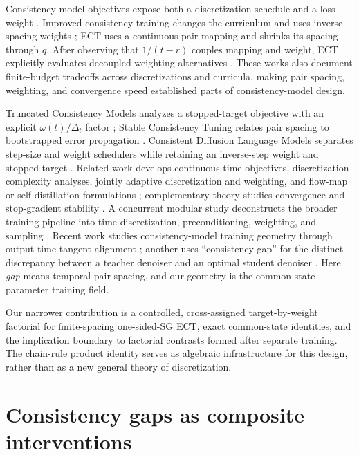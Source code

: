 \documentclass{article}
\begin{document}
Consistency-model objectives expose both a discretization schedule and a loss
weight \citep{song2023consistency}. Improved consistency training changes the
curriculum and uses inverse-spacing weights \citep{song2024improved}; ECT uses
a continuous pair mapping and shrinks its spacing through $q$. After observing
that $1/(t-r)$ couples mapping and weight, ECT explicitly evaluates decoupled
weighting alternatives \citep{geng2024consistency}.
These works also document finite-budget tradeoffs across discretizations and
curricula, making pair spacing, weighting, and convergence speed established
parts of consistency-model design.

Truncated Consistency Models analyzes a stopped-target objective with an
explicit $\omega(t)/\Delta_t$ factor \citep{lee2025truncated}; Stable
Consistency Tuning relates pair spacing to bootstrapped error propagation
\citep{wang2024stable}. Consistent Diffusion Language Models separates
step-size and weight schedulers while retaining an inverse-step weight and
stopped target \citep{amin2026consistent}. Related work develops
continuous-time objectives, discretization-complexity analyses, jointly
adaptive discretization and weighting, and flow-map or self-distillation
formulations \citep{lu2024simplifying,yang2025discretization,bai2025adaptive,
boffi2025flowmap,boffi2025how}; complementary theory studies convergence and
stop-gradient stability \citep{li2025theory,kim2026stabilizing}.
A concurrent modular study deconstructs the broader training pipeline into time
discretization, preconditioning, weighting, and sampling
\citep{anonymous2026guide}.
Recent work studies consistency-model training geometry through output-time
tangent alignment \citep{kim2025align}; another uses ``consistency gap'' for the
distinct discrepancy between a teacher denoiser and an optimal student
denoiser \citep{zheng2025preconditioning}. Here \emph{gap} means temporal pair
spacing, and our geometry is the common-state parameter training field.

Our narrower contribution is a controlled, cross-assigned target-by-weight
factorial for finite-spacing one-sided-SG ECT, exact common-state identities,
and the implication boundary to factorial contrasts formed after separate
training. The chain-rule product identity serves as algebraic infrastructure
for this design, rather than as a new general theory of discretization.

\section{Consistency gaps as composite interventions}
\label{sec:theory}
\end{document}
